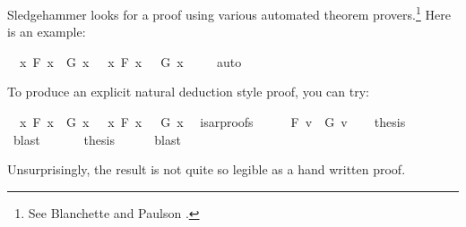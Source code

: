 \begin{isabellebody}
\begin{isamarkuptext}
Sledgehammer looks for a proof using various automated theorem provers.\footnote{See Blanchette
and Paulson \cite{blanchette_hammering_2016}.} 
Here is an example:%
\end{isamarkuptext}\isamarkuptrue%
\isamarkupfalse%
\ {\isachardoublequoteopen}{\isacharparenleft}{\isasymforall}\ x{\isachardot}\ F\ x\ {\isasymlongrightarrow}\ G\ x{\isacharparenright}\ {\isasymor}\ {\isacharparenleft}{\isasymexists}\ x{\isachardot}\ F\ x\ {\isasymand}\ {\isasymnot}\ G\ x{\isacharparenright}{\isachardoublequoteclose}\ \isamarkupfalse%
\isanewline
%
\isadelimproof
\ \ %
\endisadelimproof
%
\isatagproof
{}\isamarkupfalse%
\ auto%
\endisatagproof
{\isafoldproof}%
%
\isadelimproof
%
\endisadelimproof
%
\begin{isamarkuptext}%
To produce an explicit natural deduction style proof, you can try:%
\end{isamarkuptext}\isamarkuptrue%
\isamarkupfalse%
\ {\isachardoublequoteopen}{\isacharparenleft}{\isasymforall}\ x{\isachardot}\ F\ x\ {\isasymlongrightarrow}\ G\ x{\isacharparenright}\ {\isasymor}\ {\isacharparenleft}{\isasymexists}\ x{\isachardot}\ F\ x\ {\isasymand}\ {\isasymnot}\ G\ x{\isacharparenright}{\isachardoublequoteclose}\ \isamarkupfalse%
\ {\isacharbrackleft}isar{\isacharunderscore}proofs{\isacharbrackright}\isanewline
%
\isadelimproof
%
\endisadelimproof
%
\isatagproof
{}\isamarkupfalse%
\ {\isacharminus}\isanewline
\isacommand{{\isacharbraceleft}}\isamarkupfalse%
\ \isamarkupfalse%
\ {\isachardoublequoteopen}{\isasymnot}\ F\ v{}{\isacharunderscore}{}\ {\isasymor}\ G\ v{}{\isacharunderscore}{}{\isachardoublequoteclose}\isanewline
\ \ \isamarkupfalse%
\ {\isacharquery}thesis\isanewline
\ \ \ \ \ \ \isamarkupfalse%
\ blast\ \isacommand{{\isacharbraceright}}\isamarkupfalse%
\isanewline
\ \ \isamarkupfalse%
\ \isamarkupfalse%
\ {\isacharquery}thesis\isanewline
\ \ \ \ \isamarkupfalse%
\ blast\isanewline
{}\isamarkupfalse%
%
\endisatagproof
{\isafoldproof}%
%
\isadelimproof
%
\endisadelimproof
%
\begin{isamarkuptext}%
Unsurprisingly, the result is not quite so legible as a hand written proof.%
\end{isamarkuptext}\isamarkuptrue%
%
\isamarkuptrue%
%
\begin{isamarkuptext}%

\end{isamarkuptext}
\end{isabellebody}
